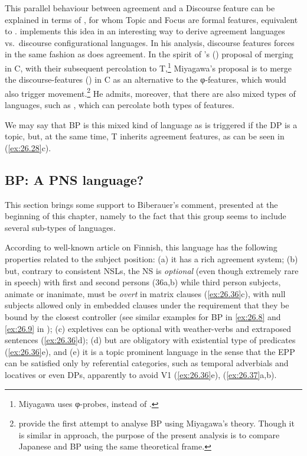\documentclass[output=paper]{langsci/langscibook}
\begin{document}
This parallel behaviour between agreement and a Discourse feature can be
explained in terms of \citet{HolNik2002}, for whom Topic and
Focus are
formal features, equivalent to .  implements
this idea in an interesting way to derive agreement languages vs.\ discourse
configurational languages.  In his analysis, discourse features forces 
in the same fashion as does agreement. In the spirit of
\citeauthor{Chomsky2007}’s (\citeyear{Chomsky2007,Chomsky2008})
proposal of merging  in C, with their subsequent percolation to
T,\footnote{Miyagawa uses φ-probes, instead of .} Miyagawa’s proposal
is to merge the discourse-features () in C as an  alternative  to the
φ{}-features, which would also trigger
movement.\footnote{\textcite{NavesEtAl2013} provide the first attempt to analyse
    \gls{BP} using Miyagawa’s theory.  Though  it is
    similar in approach, the purpose of the present analysis  is to compare
Japanese and \gls{BP} using the same theoretical
frame.} He admits, moreover, that there are also mixed types of languages,
such as , which can percolate both types of features.

We may say that \gls{BP} is this mixed kind of
language as  is triggered if the DP is a topic, but, at the same time, T
inherits agreement features, as can be seen in (\ref{ex:26.28}c).

\subsection{BP: A PNS language?}\label{sec:26.3.3}

This section brings some support to Biberauer’s comment, presented at the
beginning of this chapter, namely to the fact that this group seems
to include several sub-types of languages.

According to  well-known article on Finnish, this language
has the following properties related to the subject position: (a) it has a rich
agreement system; (b) but, contrary to consistent \gls{NSL}s, the NS is
\emph{optional} (even though extremely rare in speech) with first and second
persons (36a,b) while third person subjects, animate or inanimate, must be
\emph{overt} in matrix clauses (\ref{ex:26.36}c), with null subjects
allowed only in embedded clauses under the requirement that they be bound by
the closest controller (see similar examples for \gls{BP} in \eqref{ex:26.8} and \eqref{ex:26.9} in
); (c) expletives can be optional with weather-verbs and
extraposed sentences (\ref{ex:26.36}d); (d) but are obligatory with
existential type of predicates  (\ref{ex:26.36}e), and (e) it is a topic
prominent language in the sense that the \gls{EPP} can be satisfied only by
referential categories, such as temporal adverbials and locatives or even DPs,
apparently to avoid V1 (\ref{ex:26.36}e), (\ref{ex:26.37}a,b).
\end{document}
